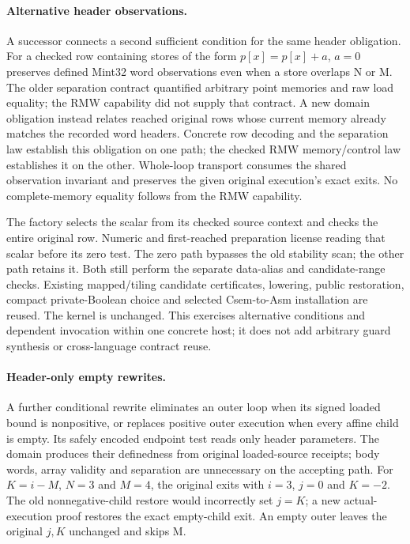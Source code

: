 \paragraph{Alternative header observations.}
A successor connects a second sufficient condition for the same header
obligation. For a checked row containing stores of the form $p[x]=p[x]+a$,
$a=0$ preserves defined Mint32 word observations even when a store overlaps N
or M. The older separation contract quantified arbitrary point memories and
raw load equality; the RMW capability did not supply that contract. A new
domain obligation instead relates reached original rows whose current memory
already matches the recorded word headers. Concrete row decoding and the
separation law establish this obligation on one path; the checked RMW
memory/control law establishes it on the other. Whole-loop transport consumes
the shared observation invariant and preserves the given original execution's
exact exits. No complete-memory equality follows from the RMW capability.

The factory selects the scalar from its checked source context and checks the
entire original row. Numeric and first-reached preparation license reading
that scalar before its zero test. The zero path bypasses the old stability
scan; the other path retains it. Both still perform the separate data-alias
and candidate-range checks. Existing mapped/tiling candidate certificates,
lowering, public restoration, compact private-Boolean choice and selected
Csem-to-Asm installation are reused. The kernel is unchanged. This exercises
alternative conditions and dependent invocation within one concrete host;
it does not add arbitrary guard synthesis or cross-language contract reuse.

\paragraph{Header-only empty rewrites.}
A further conditional rewrite eliminates an outer loop when its signed
loaded bound is nonpositive, or replaces positive outer execution when every
affine child is empty. Its safely encoded endpoint test reads only header
parameters. The domain produces their definedness from original loaded-source
receipts; body words, array validity and separation are unnecessary on the
accepting path. For $K=i-M$, $N=3$ and $M=4$, the original exits with
$i=3$, $j=0$ and $K=-2$. The old nonnegative-child restore would incorrectly
set $j=K$; a new actual-execution proof restores the exact empty-child exit.
An empty outer leaves the original $j,K$ unchanged and skips M.

